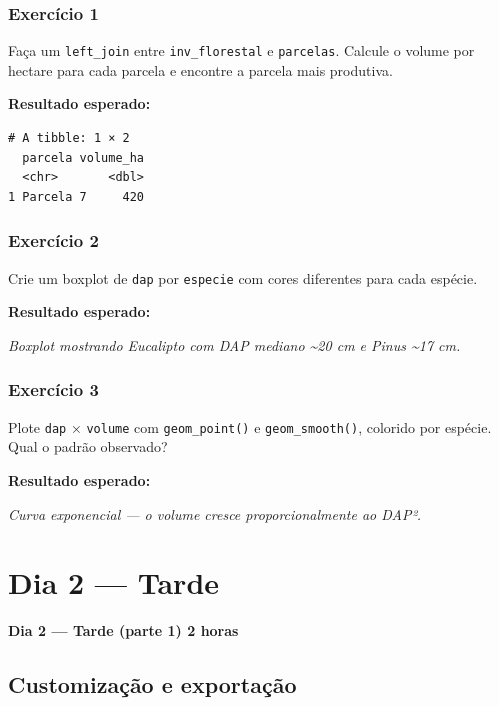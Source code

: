 \documentclass[
  letterpaper,
]{scrbook}
\begin{document}
\subsection{Exercício 1}\label{exercuxedcio-1-5}

Faça um \texttt{left\_join} entre \texttt{inv\_florestal} e
\texttt{parcelas}. Calcule o volume por hectare para cada parcela e
encontre a parcela mais produtiva.

\textbf{Resultado esperado:}

\begin{verbatim}
# A tibble: 1 × 2
  parcela volume_ha
  <chr>       <dbl>
1 Parcela 7     420
\end{verbatim}

\subsection{Exercício 2}\label{exercuxedcio-2-5}

Crie um boxplot de \texttt{dap} por \texttt{especie} com cores
diferentes para cada espécie.

\textbf{Resultado esperado:}

\emph{Boxplot mostrando Eucalipto com DAP mediano \textasciitilde20 cm e
Pinus \textasciitilde17 cm.}

\subsection{Exercício 3}\label{exercuxedcio-3-4}

Plote \texttt{dap} × \texttt{volume} com \texttt{geom\_point()} e
\texttt{geom\_smooth()}, colorido por espécie. Qual o padrão observado?

\textbf{Resultado esperado:}

\emph{Curva exponencial --- o volume cresce proporcionalmente ao DAP².}

\chapter{Dia 2 --- Tarde}\label{dia-2-tarde}

\textbf{Dia 2 --- Tarde (parte 1) \textbar{} 2 horas}

\section*{Customização e
exportação}\label{customizauxe7uxe3o-e-exportauxe7uxe3o}
\end{document}
